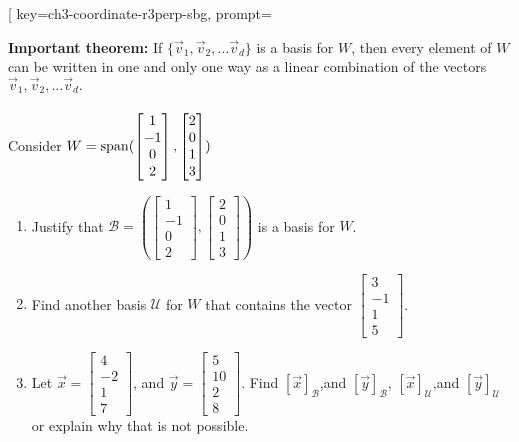 
\begin{SaveQuestion}[
        key=ch3-coordinate-r3perp-sbg,
        prompt={{\bf { Important theorem:} }  If $\{\vec v_1, \vec v_2, \dots \vec v_d\} $  is a basis for $W$, then every element of $W$ can be written in {\sc one and only one } way as a linear combination of the vectors $\vec v_1, \vec v_2, \dots \vec v_d.$ \\ \\ Consider  $W =\operatorname{span}(\begin{bmatrix}1\\-1\\0\\2\end{bmatrix}, \begin{bmatrix}2\\0\\1\\3\end{bmatrix}) $ \begin{enumerate}\item Justify that $\mathcal B=(\begin{bmatrix}1\\-1\\0\\2\end{bmatrix}, \begin{bmatrix}2\\0\\1\\3\end{bmatrix})$ is a basis for $W$.\item Find another basis $\mathcal U$ for $W$ that contains the vector $\begin{bmatrix}3\\-1\\1\\5\end{bmatrix}$. \item  Let $\vec x =\begin{bmatrix}4\\-2\\1\\7\end{bmatrix}$, and $\vec y=\begin{bmatrix}5\\10\\2\\8\end{bmatrix}$. Find $[\vec x]_{\mathcal B}$,and $[\vec y]_{\mathcal B}$, $[\vec x]_{\mathcal U}$,and $[\vec y]_{\mathcal U}$  or explain why that is not possible. 

\end{enumerate}}
\end{SaveQuestion}
